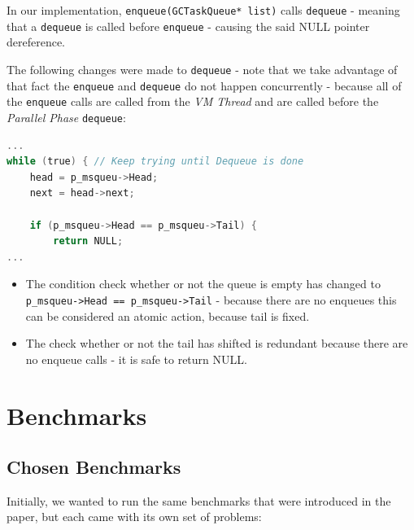 \documentclass{article}
\begin{document}
In our implementation, \lstinline{enqueue(GCTaskQueue* list)} calls \lstinline{dequeue} - meaning that a \lstinline{dequeue} is called before \lstinline{enqueue} - causing the said NULL pointer dereference.

The following changes were made to \texttt{dequeue} - note that we take advantage of that fact the \texttt{enqueue} and \texttt{dequeue} do not happen concurrently - because all of the \lstinline{enqueue} calls are called from the \textit{VM Thread} and are called before the \textit{Parallel Phase} \lstinline{dequeue}:

\begin{lstlisting}[language=C]
...
while (true) { // Keep trying until Dequeue is done
    head = p_msqueu->Head; 
    next = head->next; 

    if (p_msqueu->Head == p_msqueu->Tail) { 
        return NULL; 
...
\end{lstlisting}

\begin{itemize}
\item The condition check whether or not the queue is empty has changed to \texttt{p\_msqueu->Head == p\_msqueu->Tail} - because there are no enqueues this can be considered an atomic action, because tail is fixed.
\item The check whether or not the tail has shifted is redundant because there are no enqueue calls - it is safe to return NULL.
\end{itemize}

 \newpage

 \section{Benchmarks}
 \subsection{Chosen Benchmarks}
 Initially, we wanted to run the same benchmarks that were introduced in the paper, but each came with its own set of problems:
\end{document}
